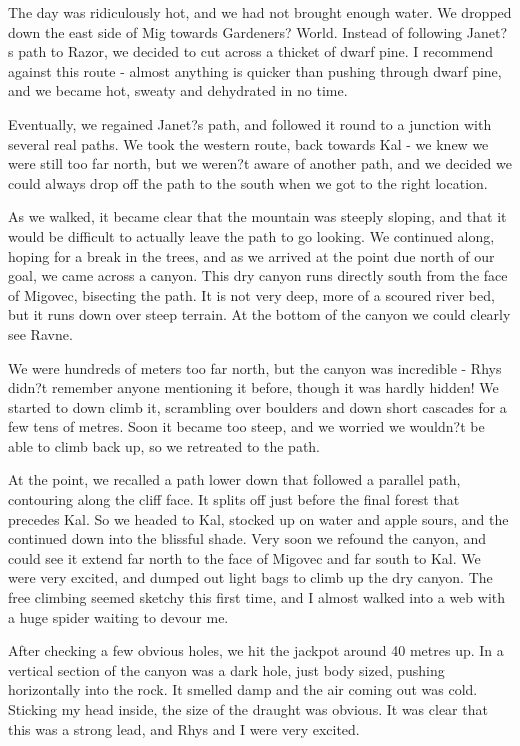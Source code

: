     The day was ridiculously hot, and we had not brought enough water. We dropped down the east side of Mig towards Gardeners? World. Instead of following Janet?s path to Razor, we decided to cut across a thicket of dwarf pine. I recommend against this route - almost anything is quicker than pushing through dwarf pine, and we became hot, sweaty and dehydrated in no time.

    Eventually, we regained Janet?s path, and followed it round to a junction with several real paths. We took the western route, back towards Kal - we knew we were still too far north, but we weren?t aware of another path, and we decided we could always drop off the path to the south when we got to the right location.

    As we walked, it became clear that the mountain was steeply sloping, and that it would be difficult to actually leave the path to go looking. We continued along, hoping for a break in the trees, and as we arrived at the point due north of our goal, we came across a canyon. This dry canyon runs directly south from the face of Migovec, bisecting the path. It is not very deep, more of a scoured river bed, but it runs down over steep terrain. At the bottom of the canyon we could clearly see Ravne.

    We were hundreds of meters too far north, but the canyon was incredible - Rhys didn?t remember anyone mentioning it before, though it was hardly hidden! We started to down climb it, scrambling over boulders and down short cascades for a few tens of metres. Soon it became too steep, and we worried we wouldn?t be able to climb back up, so we retreated to the path.

    At the point, we recalled a path lower down that followed a parallel path, contouring along the cliff face. It splits off just before the final forest that precedes Kal. So we headed to Kal, stocked up on water and apple sours, and the continued down into the blissful shade. Very soon we refound the canyon, and could see it extend far north to the face of Migovec and far south to Kal. We were very excited, and dumped out light bags to climb up the dry canyon. The free climbing seemed sketchy this first time, and I almost walked into a web with a huge spider waiting to devour me. 

    After checking a few obvious holes, we hit the jackpot around 40 metres up. In a vertical section of the canyon was a dark hole, just body sized, pushing horizontally into the rock. It smelled damp and the air coming out was cold. Sticking my head inside, the size of the draught was obvious. It was clear that this was a strong lead, and Rhys and I were very excited.


